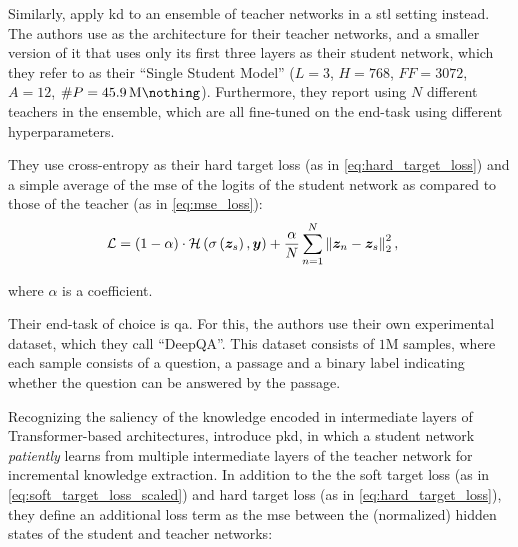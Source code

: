 Similarly, \citet{yang2019model} apply \gls{kd} to an ensemble of teacher networks in a \gls{stl} setting instead. The authors use \bertbase as the architecture for their teacher networks, and a smaller version of it that uses only its first three layers as their student network, which they refer to as their ``Single Student Model'' ($L=3$, $H=768$, $FF=3072$, $A=12$, $\#P=\SI{45.9}{\mega\nothing}$). Furthermore, they report using $N$ different teachers in the ensemble, which are all fine-tuned on the end-task using different hyperparameters.

They use cross-entropy as their hard target loss (as in \cref{eq:hard_target_loss}) and a simple average of the \gls{mse} of the logits of the student network as compared to those of the teacher (as in \cref{eq:mse_loss}):
\begin{align}
    \mathcal{L} &= (1 - \alpha) \cdot \ce{\softmax{\vect{z}_s}, \vect{y}} + \frac{\alpha}{N} \sum_{n=1}^N \norm{\vect{z}_n - \vect{z}_s}_2^2,
\end{align}

where $\alpha$ is a coefficient.

Their end-task of choice is \gls{qa}. For this, the authors use their own experimental dataset, which they call ``DeepQA''. This dataset consists of $1$M samples, where each sample consists of a question, a passage and a binary label indicating whether the question can be answered by the passage.


Recognizing the saliency of the knowledge encoded in intermediate layers of Transformer-based architectures, \citet{sun2019patient} introduce \gls{pkd}, in which a student network \emph{patiently} learns from multiple intermediate layers of the teacher network for incremental knowledge extraction. In addition to the the soft target loss (as in \cref{eq:soft_target_loss_scaled}) and hard target loss (as in \cref{eq:hard_target_loss}), they define an additional loss term as the \gls{mse} between the (normalized) hidden states of the student and teacher networks:

